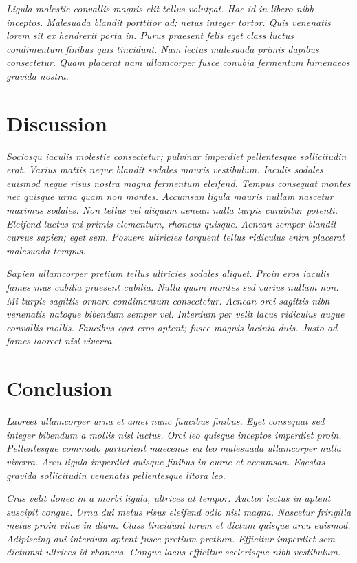 \documentclass[
  10pt,
  a4paper,
]{scrbook}
\let\oldemph\emph
\renewcommand\emph[1]{\oldemph{\color{gray}#1}} %
\begin{document}
\emph{Ligula molestie convallis magnis elit tellus volutpat. Hac id in
libero nibh inceptos. Malesuada blandit porttitor ad; netus integer
tortor. Quis venenatis lorem sit ex hendrerit porta in. Purus praesent
felis eget class luctus condimentum finibus quis tincidunt. Nam lectus
malesuada primis dapibus consectetur. Quam placerat nam ullamcorper
fusce conubia fermentum himenaeos gravida nostra.}

\chapter{Discussion}\label{discussion}

\emph{Sociosqu iaculis molestie consectetur; pulvinar imperdiet
pellentesque sollicitudin erat. Varius mattis neque blandit sodales
mauris vestibulum. Iaculis sodales euismod neque risus nostra magna
fermentum eleifend. Tempus consequat montes nec quisque urna quam non
montes. Accumsan ligula mauris nullam nascetur maximus sodales. Non
tellus vel aliquam aenean nulla turpis curabitur potenti. Eleifend
luctus mi primis elementum, rhoncus quisque. Aenean semper blandit
cursus sapien; eget sem. Posuere ultricies torquent tellus ridiculus
enim placerat malesuada tempus.}

\emph{Sapien ullamcorper pretium tellus ultricies sodales aliquet. Proin
eros iaculis fames mus cubilia praesent cubilia. Nulla quam montes sed
varius nullam non. Mi turpis sagittis ornare condimentum consectetur.
Aenean orci sagittis nibh venenatis natoque bibendum semper vel.
Interdum per velit lacus ridiculus augue convallis mollis. Faucibus eget
eros aptent; fusce magnis lacinia duis. Justo ad fames laoreet nisl
viverra.}

\chapter{Conclusion}\label{conclusion}

\emph{Laoreet ullamcorper urna et amet nunc faucibus finibus. Eget
consequat sed integer bibendum a mollis nisl luctus. Orci leo quisque
inceptos imperdiet proin. Pellentesque commodo parturient maecenas eu
leo malesuada ullamcorper nulla viverra. Arcu ligula imperdiet quisque
finibus in curae et accumsan. Egestas gravida sollicitudin venenatis
pellentesque litora leo.}

\emph{Cras velit donec in a morbi ligula, ultrices at tempor. Auctor
lectus in aptent suscipit congue. Urna dui metus risus eleifend odio
nisl magna. Nascetur fringilla metus proin vitae in diam. Class
tincidunt lorem et dictum quisque arcu euismod. Adipiscing dui interdum
aptent fusce pretium pretium. Efficitur imperdiet sem dictumst ultrices
id rhoncus. Congue lacus efficitur scelerisque nibh vestibulum.}
\end{document}
